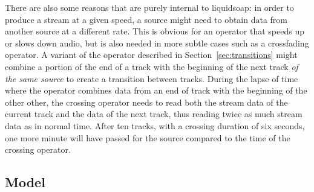 There are also some reasons that are purely internal to liquidsoap:
in order to produce a stream at a given speed,
a source might need to obtain data from another source at
a different rate. This is obvious for an operator that speeds up or
slows down audio, but is also needed in more subtle cases
such as a crossfading operator. A variant of the operator described
in Section~\ref{sec:transitions} might combine a portion
of the end of a track with the beginning of the next track
\emph{of the same source} to create a transition between tracks.
During the lapse of time where the operator combines data from an end of track
with the beginning of the other other, the crossing operator needs to read both
the stream data of the current track and the data of the next track, thus
reading twice as much stream data as in normal time.
After ten tracks,
with a crossing duration of six seconds, one more minute will have
passed for the source compared to the time of the crossing operator.

\subsection{Model}

